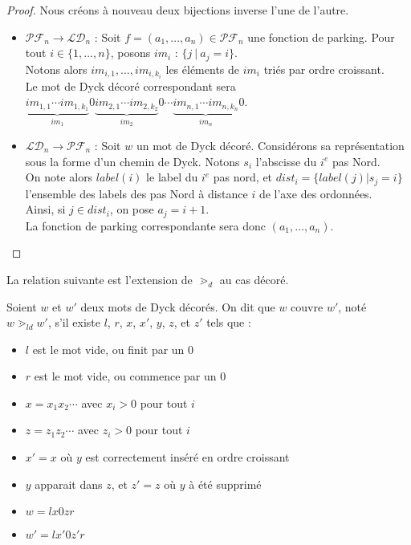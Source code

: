 \begin{proof}
    Nous créons à nouveau deux bijections inverse l'une de l'autre.
    \begin{itemize}
        \item $\mathcal{PF}_n \to \mathcal{LD}_n$ :
        Soit $f = (a_1, \ldots, a_n) \in \mathcal{PF}_n$ une fonction de
        parking. Pour tout $i \in \{1, \ldots, n\}$, posons $im_i$ :
        $\{j\ |\ a_j = i\}$. \\
        Notons alors $im_{i,1}, \ldots, im_{i,k_i}$ les éléments de $im_i$
        triés par ordre croissant.\\
        Le mot de Dyck décoré correspondant sera 
        $\underbrace{im_{1,1} \cdots im_{1,k_1}}_{im_1}0
         \underbrace{im_{2,1} \cdots im_{2,k_2}}_{im_2}0
         \cdots
         \underbrace{im_{n,1} \cdots im_{n,k_n}}_{im_n}0$.

        \item $\mathcal{LD}_n \to \mathcal{PF}_n$ :
        Soit $w$ un mot de Dyck décoré. Considérons sa représentation sous
        la forme d'un chemin de Dyck. Notons $s_i$ l'abscisse du $i^{e}$ pas
        Nord.\\
        On note alors $label(i)$ le label du $i^{e}$ pas nord, et
        $dist_i = \{label(j) | s_j = i\}$ l'ensemble  des labels des pas
        Nord à distance $i$ de l'axe des ordonnées.\\
        Ainsi, si $j \in dist_i$, on pose $a_j = i + 1$.\\
        La fonction de parking correspondante sera donc $(a_1, \ldots, a_n)$.
    \end{itemize}
\end{proof}

La relation suivante est l'extension de $\gtrdot_d$ au cas décoré.

\begin{definition}[$\gtrdot_{ld}$]
    Soient $w$ et $w'$ deux mots de Dyck décorés. On dit que $w$ couvre
    $w'$, noté $w \gtrdot_{ld} w'$, s'il existe $l$, $r$, $x$, $x'$, $y$,
    $z$, et $z'$ tels que :
    \begin{itemize}
        \item $l$ est le mot vide, ou finit par un $0$
        \item $r$ est le mot vide, ou commence par un $0$
        \item $x = x_1x_2 \cdots$ avec $x_i > 0$ pour tout $i$
        \item $z = z_1z_2 \cdots$ avec $z_i > 0$ pour tout $i$
        \item $x' = x$ où $y$ est correctement inséré en ordre croissant
        \item $y$ apparait dans $z$, et $z' = z$ où $y$ à été supprimé
        \item $w = lx0zr$
        \item $w' = lx'0z'r$
    \end{itemize}
\end{definition} %

